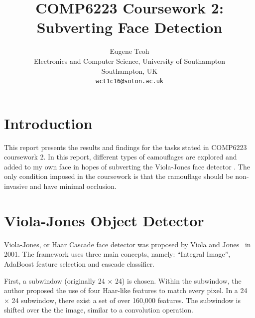 \documentclass[10pt,twocolumn,letterpaper]{article}
\begin{document}
\title{COMP6223 Coursework 2: Subverting Face Detection}

\author{Eugene Teoh\\
Electronics and Computer Science, University of Southampton\\
Southampton, UK\\
{\tt\small wct1c16@soton.ac.uk}
}

\maketitle


   

\section{Introduction}


This report presents the results and findings for the tasks stated in COMP6223 coursework 2. In this report, different types of camouflages are explored and added to my own face in hopes of subverting the Viola-Jones face detector \cite{viola-jones}. The only condition imposed in the coursework is that the camouflage should be non-invasive and have minimal occlusion.

\section{Viola-Jones Object Detector}

Viola-Jones, or Haar Cascade face detector was proposed by Viola and Jones~\cite{viola-jones} in 2001. The framework uses three main concepts, namely: ``Integral Image'', AdaBoost feature selection and cascade classifier.

First, a subwindow (originally 24 $\times$ 24) is chosen. Within the subwindow, the author proposed the use of four Haar-like features to match every pixel. In a 24 $\times$ 24 subwindow, there exist a set of over 160,000 features. The subwindow is shifted over the the image, similar to a convolution operation.
\end{document}
